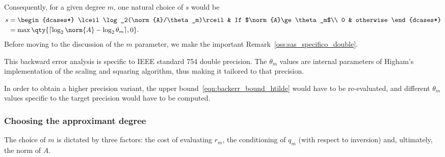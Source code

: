 Consequently, for a given degree $m$, one natural choice of $s$ would be 
\begin{equation}\label{eqn:def_scaling_factor}
	\begin{aligned}
	s &= \begin{dcases*}
		\lceil\log_2(\norm{A}/\theta_m)\rceil & If $\norm{A}\ge\theta_m$\\
		0 & otherwise
	\end{dcases*}\\
	&= \max\qty{\lceil\log_2\norm{A}-\log_2\theta_m\rceil,0}.
	\end{aligned}
\end{equation}
Before moving to the discussion of the $m$ parameter, we make the important Remark~\ref{oss:sas_specifico_double}.
\begin{oss}\label{oss:sas_specifico_double}
	This backward error analysis is specific to \textsc{IEEE} standard 754 double precision. The $\theta_m$ values are internal parameters of Higham's implementation of the scaling and squaring algorithm, thus making it tailored to that precision.
	
	In order to obtain a higher precision variant, the upper bound~\eqref{eqn:backerr_bound_htilde} would have to be re-evaluated, and different $\theta_m$ values specific to the target precision would have to be computed. 
\end{oss}

\subsubsection{Choosing the approximant degree}\label{subs:choosing_approx_deg}
The choice of $m$ is dictated by three factors: the cost of evaluating $r_m$, the conditioning of $q_m$ (with respect to inversion) and, ultimately, the norm of $A$.

